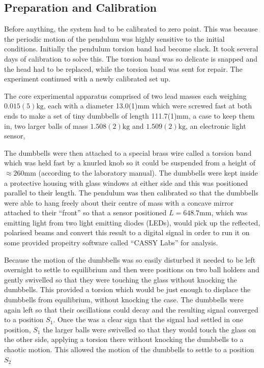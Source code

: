 \documentclass[12pt]{article}
\begin{document}
\subsection{Preparation and Calibration}

Before anything, the system had to be calibrated to zero point. This was because the periodic motion of the pendulum was highly sensitive to the initial conditions. Initially the pendulum torsion band had become slack. It took several days of calibration to solve this. The torsion band was so delicate is snapped and the head had to be replaced, while the torsion band was sent for repair. The experiment continued with a newly calibrated set up.

The core experimental apparatus comprised of two lead masses each weighing $0.015(5)\mathrm{kg}$, each with a diameter 13.0(1)mm which were screwed fast at both ends to make a set of tiny dumbbells of length 111.7(1)mm, a case to keep them in, two larger balls of mass $1.508(2)\mathrm{kg}$ and $1.509(2)\mathrm{kg}$, an electronic light sensor, 

The dumbbells were then attached to a special brass wire called a torsion band which was held fast by a knurled knob so it could be suspended from a height of $\approx 260\mathrm{mm}$ (according to the laboratory manual).  The dumbbells were kept inside a protective housing with glass windows at either side and this was positioned parallel to their length. The pendulum was then calibrated so that the dumbbells were able to hang freely about their centre of mass with a concave mirror attached to their \enquote{front} so that a sensor positioned $L=648.7\mathrm{mm}$, which was emitting light from two light emitting diodes (LEDs), would pick up the reflected, polarised beams and convert this result to a digital signal in order to run it on some provided propeitry software called \enquote{CASSY Labs} for analysis.

Because the motion of the dumbbells was so easily disturbed it needed to be left overnight to settle to equilibrium and then were positions on two ball holders and gently swivelled so that they were touching the glass without knocking the dumbbells. This provided a torsion which would be just enough to displace the dumbbells from equilibrium, without knocking the case. The dumbbells were again left so that their oscillations could decay and the resulting signal converged to a position $S_{1}$. Once the was a clear sign that the signal had settled in one position, $S_{1}$ the larger balls were swivelled so that they would touch the glass on the other side, applying a torsion there without knocking the dumbbells to a chaotic motion. This allowed the motion of the dumbbells to settle to a position $S_{2}$
\end{document}
